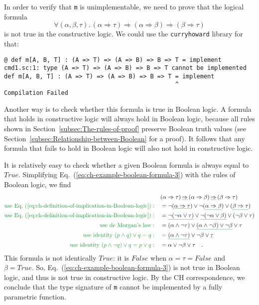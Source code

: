 In order to verify that \lstinline!m! is unimplementable, we need
to prove that the logical formula
\begin{equation}
\forall(\alpha,\beta,\tau).\,(\alpha\Rightarrow\tau)\Rightarrow(\alpha\Rightarrow\beta)\Rightarrow(\beta\Rightarrow\tau)\label{eq:ch-example-boolean-formula-3}
\end{equation}
is not true in the constructive logic. We could use the \texttt{curryhoward}
library for that:
\begin{lstlisting}
@ def m[A, B, T] : (A => T) => (A => B) => B => T = implement
cmd1.sc:1: type (A => T) => (A => B) => B => T cannot be implemented
def m[A, B, T] : (A => T) => (A => B) => B => T = implement
                                                ^
Compilation Failed
\end{lstlisting}
Another way is to check whether this formula is true in Boolean logic.
A formula that holds in constructive logic will always hold in Boolean
logic, because all rules shown in Section~\ref{subsec:The-rules-of-proof}
preserve Boolean truth values (see Section~\ref{subsec:Relationship-between-Boolean}
for a proof). It follows that any formula that fails to hold in Boolean
logic will also not hold in constructive logic. 

It is relatively easy to check whether a given Boolean formula is
always equal to $True$. Simplifying Eq.~(\ref{eq:ch-example-boolean-formula-3})
with the rules of Boolean logic, we find
\begin{align*}
 & (\alpha\Rightarrow\tau)\,\gunderline{\Rightarrow}\,(\alpha\Rightarrow\beta)\,\gunderline{\Rightarrow}\,(\beta\Rightarrow\tau)\\
{\color{greenunder}\text{use Eq.~(\ref{eq:ch-definition-of-implication-in-Boolean-logic})}:}\quad & =\neg(\gunderline{\alpha\Rightarrow\tau})\vee\neg(\gunderline{\alpha\Rightarrow\beta})\vee(\gunderline{\beta\Rightarrow\tau})\\
{\color{greenunder}\text{use Eq.~(\ref{eq:ch-definition-of-implication-in-Boolean-logic})}:}\quad & =\gunderline{\neg(\neg\alpha\vee\tau)}\vee\gunderline{\neg(\neg\alpha\vee\beta)}\vee(\neg\beta\vee\tau)\\
{\color{greenunder}\text{use de Morgan's law}:}\quad & =\left(\alpha\wedge\neg\tau\right)\vee\gunderline{\left(\alpha\wedge\neg\beta\right)\vee\neg\beta}\vee\tau\\
{\color{greenunder}\text{use identity }(p\wedge q)\vee q=q:}\quad & =\gunderline{\left(\alpha\wedge\neg\tau\right)}\vee\neg\beta\vee\gunderline{\tau}\\
{\color{greenunder}\text{use identity }(p\wedge\neg q)\vee q=p\vee q:}\quad & =\alpha\vee\neg\beta\vee\tau\quad.
\end{align*}
This formula is not identically $True$: it is $False$ when $\alpha=\tau=False$
and $\beta=True$. So, Eq.~(\ref{eq:ch-example-boolean-formula-3})
is not true in Boolean logic, and thus is not true in constructive
logic. By the CH correspondence, we conclude that the type signature
of \lstinline!m! cannot be implemented by a fully parametric function.

